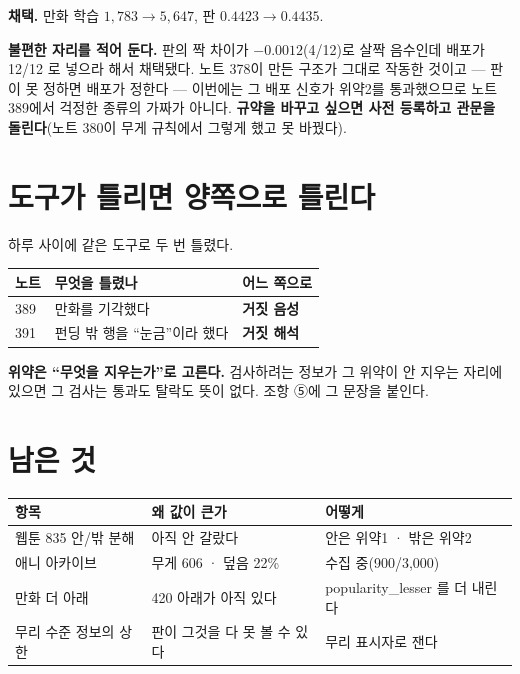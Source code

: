 \documentclass[11pt]{article}
\begin{document}
\textbf{채택.} 만화 학습 $1{,}783 \to 5{,}647$, 판 $0.4423 \to 0.4435$.

\textbf{불편한 자리를 적어 둔다.} 판의 짝 차이가 $-0.0012$(4/12)로 살짝
음수인데 배포가 12/12 로 넣으라 해서 채택됐다. 노트 378이 만든 구조가
그대로 작동한 것이고 --- 판이 못 정하면 배포가 정한다 --- 이번에는 그
배포 신호가 위약2를 통과했으므로 노트 389에서 걱정한 종류의 가짜가
아니다. \textbf{규약을 바꾸고 싶으면 사전 등록하고 관문을 돌린다}(노트
380이 무게 규칙에서 그렇게 했고 못 바꿨다).

\section{도구가 틀리면 양쪽으로 틀린다}

하루 사이에 같은 도구로 두 번 틀렸다.

\begin{center}
\begin{tabular}{lll}
\hline
노트 & 무엇을 틀렸나 & 어느 쪽으로 \\
\hline
389 & 만화를 기각했다 & \textbf{거짓 음성} \\
391 & 펀딩 밖 행을 ``눈금''이라 했다 & \textbf{거짓 해석} \\
\hline
\end{tabular}
\end{center}

\textbf{위약은 ``무엇을 지우는가''로 고른다.} 검사하려는 정보가 그 위약이
안 지우는 자리에 있으면 그 검사는 통과도 탈락도 뜻이 없다. 조항 ⑤에
그 문장을 붙인다.

\section{남은 것}

\begin{center}
\begin{tabular}{lll}
\hline
항목 & 왜 값이 큰가 & 어떻게 \\
\hline
웹툰 835 안/밖 분해 & 아직 안 갈랐다 & 안은 위약1 · 밖은 위약2 \\
애니 아카이브 & 무게 606 · 덮음 22\% & 수집 중(900/3,000) \\
만화 더 아래 & 420 아래가 아직 있다 & popularity\_lesser 를 더 내린다 \\
무리 수준 정보의 상한 & 판이 그것을 다 못 볼 수 있다 & 무리 표시자로 잰다 \\
\hline
\end{tabular}
\end{center}
\end{document}
